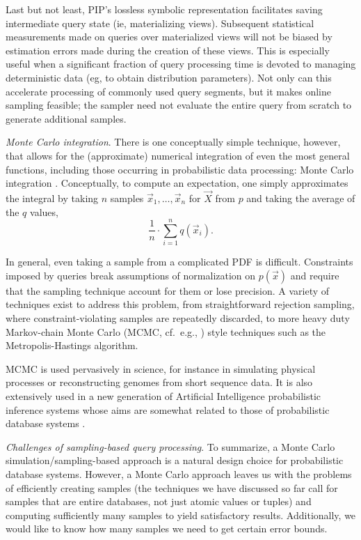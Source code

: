 Last but not least, PIP's lossless symbolic representation facilitates saving intermediate query state (ie, materializing views).  Subsequent statistical measurements made on queries over materialized views will not be biased by estimation errors made during the creation of these views.  This is especially useful when a significant fraction of query processing time is devoted to managing deterministic data (eg, to obtain distribution parameters).  Not only can this accelerate processing of commonly used query segments, but it makes online sampling feasible; the sampler need not evaluate the entire query from scratch to generate additional samples.

{\em Monte Carlo integration}\/.
There is one conceptually simple technique, however, that  allows for the (approximate) numerical integration of even  the most general  functions, including those occurring in  probabilistic data  processing: Monte Carlo integration \cite{montecarlo}. Conceptually, to compute an expectation, one simply approximates   the  integral  by  taking $n$ samples $\vec{x}_1, \dots, \vec{x}_n$ for $\vec{X}$ from $p$  and  taking  the  average of the $q$ values,
%
\begin{equation}\label{eq:mc_expectation}
\frac{1}{n} \cdot \sum_{i=1}^n q(\vec{x}_i).
\end{equation}

In general, even taking a sample from a complicated PDF is difficult.  Constraints imposed by queries break assumptions of normalization on $p(\vec x)$ and require that the sampling technique account for them or lose precision.  A variety of techniques exist to address this problem, from straightforward rejection sampling, where constraint-violating samples are repeatedly discarded, to more heavy duty Markov-chain Monte Carlo (MCMC, cf.\ e.g., \cite{GRS1995}) style techniques such as the Metropolis-Hastings algorithm\cite{metropolis,GRS1995}. 

MCMC is used pervasively in science, for instance in simulating  physical processes  or reconstructing  genomes  from short sequence data.  It is also extensively used in a new generation of Artificial Intelligence probabilistic inference systems whose aims are somewhat related to those of probabilistic database systems \cite{RD2006, BLOG}.

{\em Challenges  of sampling-based query processing}\/.  To  summarize, a Monte Carlo simulation/sampling-based approach is  a  natural  design  choice  for  probabilistic  database  systems. However,  a  Monte Carlo  approach  leaves  us  with the  problems  of efficiently creating samples (the  techniques we have discussed so far call for samples that are  entire databases, not just atomic values or tuples) and computing sufficiently  many samples to yield satisfactory results.  Additionally, we would like to know how many samples we need to get certain error bounds.


